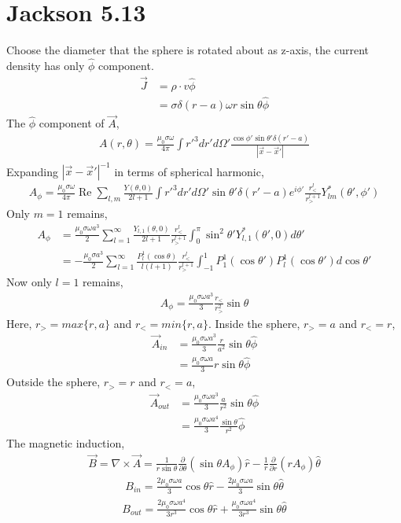 \documentclass{article}
\begin{document}
\section*{Jackson 5.13}

Choose the diameter that the sphere is rotated about as z-axis, the current density has only $\hat\phi$ component.
\begin{align*}
  \vec J&=\rho\cdot v\hat\phi\\
        &=\sigma\delta(r-a)\omega r\sin\theta\hat\phi
\end{align*}
The $\hat\phi$ component of $\vec A$,
\begin{align*}
  A(r,\theta)=\frac{\mu_0\sigma\omega}{4\pi}\int r'^3dr'd\Omega'\frac{\cos\phi'\sin\theta'\delta(r'-a)}{|\vec x-\vec x'|}
\end{align*}
Expanding $|\vec x-\vec x'|^{-1}$ in terms of spherical harmonic,
\begin{align*}
  A_\phi=\frac{\mu_0\sigma\omega}{4\pi}\operatorname{Re}\sum_{l,m}\frac{Y(\theta,0)}{2l+1}\int r'^3dr'd\Omega'\sin\theta'\delta(r'-a)e^{i\phi'}\frac{r_<^l}{r_>^{l+1}}Y^*_{lm}(\theta',\phi')
\end{align*}
Only $m=1$ remains,
\begin{align*}
  A_\phi&=\frac{\mu_0\sigma\omega a^3}{2}\sum_{l=1}^{\infty}\frac{Y_{l,1}(\theta,0)}{2l+1}\frac{r_<^l}{r_>^{l+1}}\int_0^{\pi}\sin^2\theta'Y^*_{l,1}(\theta',0)d\theta'\\
        &=-\frac{\mu_0\sigma a^3}{2}\sum_{l=1}^{\infty}\frac{P^1_l(\cos\theta)}{l(l+1)}\frac{r_<^l}{r_>^{l+1}}\int_{-1}^{1}P^1_1(\cos\theta')P_l^1(\cos\theta')d\cos\theta'
\end{align*}
Now only $l=1$ remains,
\begin{align*}
  A_\phi=\frac{\mu_0\sigma\omega a^3}{3}\frac{r_<}{r_>^{2}}\sin\theta
\end{align*}
Here, $r_>=max\{r,a\}$ and $r_<=min\{r,a\}$.
Inside the sphere, $r_>=a$ and $r_<=r$,
\begin{align*}
\vec  A_{in}&=\frac{\mu_0\sigma\omega a^3}{3}\frac{r}{a^2}\sin\theta\hat\phi\\
        &=\frac{\mu_0\sigma\omega a}{3}r\sin\theta\hat\phi
\end{align*}
Outside the sphere, $r_>=r$ and $r_<=a$,
\begin{align*}
\vec  A_{out}&=\frac{\mu_0\sigma\omega a^3}{3}\frac{a}{r^2}\sin\theta\hat\phi\\
  &=\frac{\mu_0\sigma\omega a^4}{3}\frac{\sin\theta}{r^2}\hat\phi
\end{align*}
The magnetic induction,
\begin{align*}
  \vec B=\nabla\times\vec A=\frac{1}{r\sin\theta}\frac{\partial}{\partial\theta}(\sin\theta A_\phi)\hat r-\frac{1}{r}\frac{\partial}{\partial r}(rA_\phi)\hat\theta
\end{align*}
\begin{align*}
  B_{in}=\frac{2\mu_0\sigma\omega a}{3}\cos\theta\hat r-\frac{2\mu_0\sigma\omega a}{3}\sin\theta\hat\theta
\end{align*}
\begin{align*}
  B_{out}=\frac{2\mu_0\sigma\omega a^4}{3r^3}\cos\theta\hat r+\frac{\mu_0\sigma\omega a^4}{3r^3}\sin\theta\hat\theta
\end{align*}
\pagebreak
\end{document}
